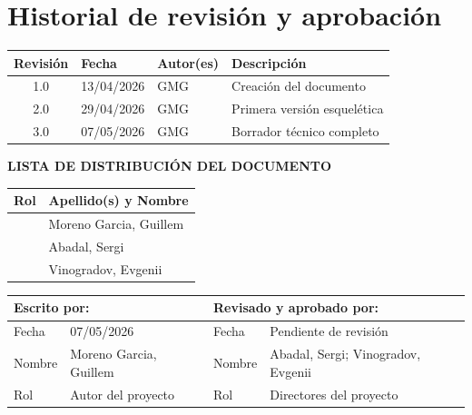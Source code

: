 \vspace*{0cm}

\chapter*{Historial de revisión y aprobación}
{}

\begin{tabularx}{\textwidth}{|c|l|l|X|}
  \hline
    \textbf{Revisión} & \textbf{Fecha} & \textbf{Autor(es)} & \textbf{Descripción} \\
  \hline
    1.0 & 13/04/2026 & GMG & Creación del documento \\
  \hline
    2.0 & 29/04/2026 & GMG & Primera versión esquelética \\
  \hline
    3.0 & 07/05/2026 & GMG & Borrador técnico completo \\
  \hline
\end{tabularx}

\vspace{1cm}

\textbf{LISTA DE DISTRIBUCIÓN DEL DOCUMENTO}

\begin{tabularx}{\textwidth}{|l|X|}
  \hline
    \textbf{Rol} & \textbf{Apellido(s) y Nombre} \\
  \hline
    [Estudiante] & Moreno Garcia, Guillem \\
  \hline
    [Director del proyecto] & Abadal, Sergi \\
  \hline
    [Director 2 (sólo si aplica)] & Vinogradov, Evgenii \\
  \hline
\end{tabularx}

\vspace{1cm}

\begin{tabularx}{\textwidth}{|l|X||l|X|}
  \hline
    \multicolumn{2}{|l||}{\textbf{Escrito por:}}  &  \multicolumn{2}{l|}{\textbf{Revisado y aprobado por:}} \\
  \hline
    Fecha &  07/05/2026 & Fecha &  Pendiente de revisión \\
  \hline
    Nombre &  Moreno Garcia, Guillem & Nombre &  Abadal, Sergi; Vinogradov, Evgenii \\
  \hline
    Rol & Autor del proyecto & Rol & Directores del proyecto \\
  \hline
\end{tabularx}
